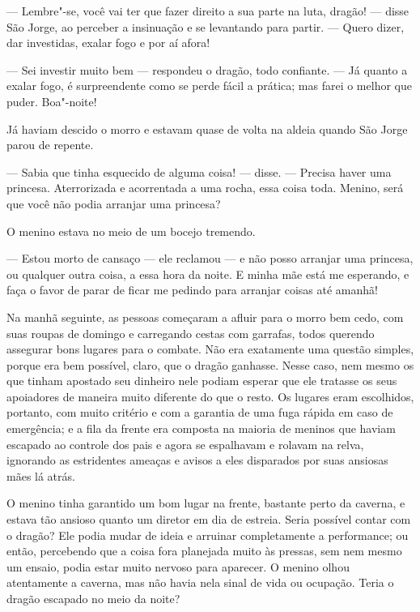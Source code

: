 --- Lembre"-se, você vai ter que fazer direito a sua parte na luta,
dragão! --- disse São Jorge, ao perceber a insinuação e se levantando
para partir. --- Quero dizer, dar investidas, exalar fogo e por aí
afora!

--- Sei investir muito bem --- respondeu o dragão, todo confiante. --- Já
quanto a exalar fogo, é surpreendente como se perde fácil a prática;
mas farei o melhor que puder. Boa"-noite!

\bigskip

Já haviam descido o morro e estavam quase de volta na aldeia quando
São Jorge parou de repente.

--- Sabia que tinha esquecido de alguma coisa! --- disse. --- Precisa haver
uma princesa. Aterrorizada e acorrentada a uma rocha, essa coisa
toda. Menino, será que você não podia arranjar uma princesa?

O menino estava no meio de um bocejo tremendo.

--- Estou morto de cansaço --- ele reclamou --- e não posso arranjar uma
princesa, ou qualquer outra coisa, a essa hora da noite. E minha mãe
está me esperando, e faça o favor de parar de ficar me pedindo para
arranjar coisas até amanhã!


\bigskip

Na manhã seguinte, as pessoas começaram a afluir para o morro bem cedo,
com suas roupas de domingo e carregando cestas com garrafas, 
todos querendo assegurar bons lugares para o combate. Não
era exatamente uma questão simples, porque era bem possível, claro,
que o dragão ganhasse. Nesse caso, nem mesmo os que tinham apostado
seu dinheiro nele podiam esperar que ele tratasse os seus apoiadores
de maneira muito diferente do que o resto. Os lugares eram
escolhidos, portanto, com muito critério e com a garantia de uma fuga
rápida em caso de emergência; e a fila da frente era composta na
maioria de meninos que haviam escapado ao controle dos pais e agora
se espalhavam e rolavam na relva, ignorando as estridentes ameaças e
avisos a eles disparados por suas ansiosas mães lá atrás.

O menino tinha garantido um bom lugar na frente, bastante perto da
caverna, e estava tão ansioso quanto um diretor em dia de estreia.
Seria possível contar com o dragão? Ele podia mudar de ideia e
arruinar completamente a performance; ou então, percebendo que a
coisa fora planejada muito às pressas, sem nem mesmo um ensaio, podia
estar muito nervoso para aparecer. O menino olhou atentamente a
caverna, mas não havia nela sinal de vida ou ocupação. Teria o dragão
escapado no meio da noite?

